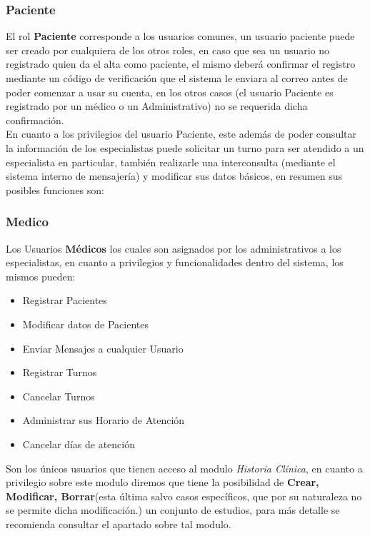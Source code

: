\subsubsection{Paciente}

El rol \textbf{Paciente} corresponde a los usuarios comunes, un usuario paciente puede ser creado por cualquiera de los otros roles, en caso que sea un usuario no registrado quien da el alta como paciente, el mismo deberá confirmar el registro mediante un código de verificación que el sistema le enviara al correo antes de poder comenzar a usar su cuenta, en los otros casos (el usuario Paciente es registrado por un médico o un Administrativo) no se requerida dicha confirmación.\\[0.1cm]

En cuanto a los privilegios del usuario Paciente, este además de poder consultar la  información de los especialistas puede solicitar un turno para ser atendido a un especialista en particular, también realizarle una interconsulta (mediante el sistema interno de mensajería) y modificar sus datos básicos, en resumen sus posibles funciones son:


\subsubsection{Medico}

Los Usuarios \textbf{Médicos} los cuales son asignados por los administrativos a los especialistas, en cuanto a privilegios y funcionalidades dentro del sistema, los mismos pueden:

\begin{itemize}
    \item Registrar Pacientes
    \item Modificar datos de Pacientes
    \item Enviar Mensajes a cualquier Usuario
    \item Registrar Turnos 
    \item Cancelar Turnos
    \item Administrar sus Horario de Atención
    \item Cancelar días de atención
\end{itemize}

Son los únicos usuarios que tienen acceso al modulo \textit{Historia Clínica}, en cuanto a privilegio sobre este modulo diremos que tiene la posibilidad de \textbf{Crear, Modificar, Borrar}(esta última salvo casos específicos, que por su naturaleza no se permite dicha modificación.) un conjunto de estudios, para más detalle se recomienda consultar el apartado sobre tal modulo.


